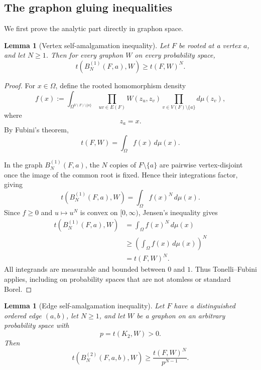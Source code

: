 \documentclass[11pt]{article}
\newtheorem{lemma}[theorem]{Lemma}
\begin{document}
\subsection{The graphon gluing inequalities}

We first prove the analytic part directly in graphon space.

\begin{lemma}[Vertex self-amalgamation inequality]
Let $F$ be rooted at a vertex $a$, and let $N\ge1$. Then for every
graphon $W$ on every probability space,
\[
    t(B_N^{(1)}(F,a),W)
    \ge
    t(F,W)^N.
\]
\end{lemma}

\begin{proof}
For $x\in\Omega$, define the rooted homomorphism density
\[
    f(x)
    :=
    \int_{\Omega^{V(F)\setminus\{a\}}}
       \prod_{uv\in E(F)}
       W(z_u,z_v)
       \prod_{v\in V(F)\setminus\{a\}}d\mu(z_v),
\]
where
\[
    z_a=x.
\]
By Fubini's theorem,
\[
    t(F,W)=\int_\Omega f(x)\,d\mu(x).
\]

In the graph $B_N^{(1)}(F,a)$, the $N$ copies of
$F\setminus\{a\}$ are pairwise vertex-disjoint once the image of the
common root is fixed. Hence their integrations factor, giving
\[
    t(B_N^{(1)}(F,a),W)
    =
    \int_\Omega f(x)^N\,d\mu(x).
\]
Since $f\ge0$ and $u\mapsto u^N$ is convex on $[0,\infty)$,
Jensen's inequality gives
\[
\begin{aligned}
    t(B_N^{(1)}(F,a),W)
    &=
    \int_\Omega f(x)^N\,d\mu(x)
    \\
    &\ge
    \left(\int_\Omega f(x)\,d\mu(x)\right)^N
    \\
    &=
    t(F,W)^N.
\end{aligned}
\]
All integrands are measurable and bounded between $0$ and $1$.
Thus Tonelli--Fubini applies, including on probability spaces that are
not atomless or standard Borel.
\end{proof}

\begin{lemma}[Edge self-amalgamation inequality]
Let $F$ have a distinguished ordered edge $(a,b)$, let $N\ge1$, and
let $W$ be a graphon on an arbitrary probability space with
\[
    p=t(K_2,W)>0.
\]
Then
\[
    t(B_N^{(2)}(F,a,b),W)
    \ge
    \frac{t(F,W)^N}{p^{N-1}}.
\]
\end{lemma}
\end{document}
